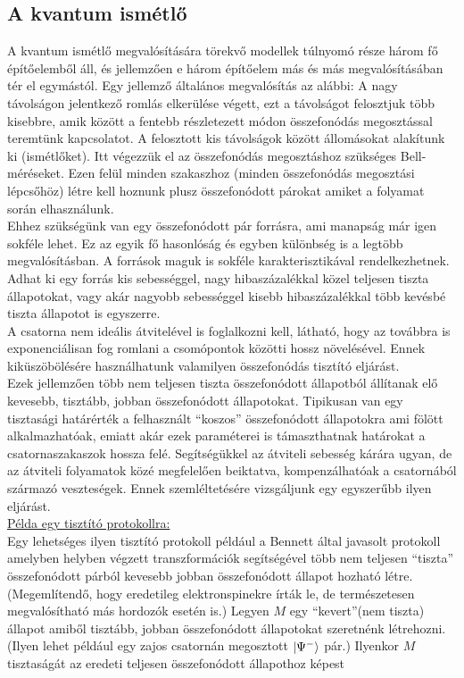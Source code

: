 \subsection{A kvantum ismétlő}
A kvantum ismétlő megvalósítására törekvő modellek túlnyomó része három fő építőelemből áll, és jellemzően e három építőelem más és más megvalósításában tér el egymástól. Egy jellemző általános megvalósítás az alábbi:
A nagy távolságon jelentkező romlás elkerülése végett, ezt a távolságot felosztjuk több kisebbre, amik között a fentebb részletezett módon összefonódás megosztással teremtünk kapcsolatot. A felosztott kis távolságok között állomásokat alakítunk ki (ismétlőket). Itt végezzük el az összefonódás megosztáshoz szükséges Bell-méréseket. Ezen felül minden szakaszhoz (minden összefonódás megosztási lépcsőhöz) létre kell hoznunk plusz összefonódott párokat amiket a folyamat során elhasználunk.\\
 Ehhez szükségünk van egy összefonódott pár forrásra, ami manapság már igen sokféle lehet. %
Ez az egyik fő hasonlóság és egyben különbség is a legtöbb megvalósításban. A források maguk is sokféle karakterisztikával rendelkezhetnek. Adhat ki egy forrás kis sebességgel, nagy hibaszázalékkal közel teljesen tiszta állapotokat, vagy akár nagyobb sebességgel kisebb hibaszázalékkal több kevésbé tiszta állapotot is egyszerre.\\
 A csatorna nem ideális átvitelével is foglalkozni kell, látható, hogy az továbbra is exponenciálisan fog romlani a csomópontok közötti hossz növelésével. Ennek kiküszöbölésére használhatunk valamilyen összefonódás tisztító eljárást.\\
 Ezek jellemzően több nem teljesen tiszta összefonódott állapotból állítanak elő kevesebb, tisztább, jobban összefonódott állapotokat. Tipikusan van egy tisztasági határérték a felhasznált “koszos” összefonódott állapotokra ami fölött alkalmazhatóak, emiatt akár ezek paraméterei is támaszthatnak határokat a csatornaszakaszok hossza felé. Segítségükkel az átviteli sebesség kárára ugyan, de az átviteli folyamatok közé megfelelően beiktatva, kompenzálhatóak a csatornából származó veszteségek. Ennek szemléltetésére vizsgáljunk egy egyszerűbb ilyen eljárást.\\
\underline{Példa egy tisztító protokollra:}\\
Egy lehetséges ilyen tisztító protokoll például a Bennett által javasolt protokoll\cite{bennett1996purification} amelyben helyben végzett transzformációk segítségével több nem teljesen “tiszta” összefonódott párból kevesebb jobban összefonódott állapot hozható létre. (Megemlítendő, hogy eredetileg elektronspinekre írták le, de természetesen megvalósítható más hordozók esetén is.) Legyen $M$ egy “kevert”(nem tiszta) állapot amiből tisztább, jobban összefonódott állapotokat szeretnénk létrehozni. (Ilyen lehet például egy zajos csatornán megosztott $ \ket{\Psi^-} $  pár.) Ilyenkor $M$ tisztaságát az eredeti teljesen összefonódott állapothoz képest 
